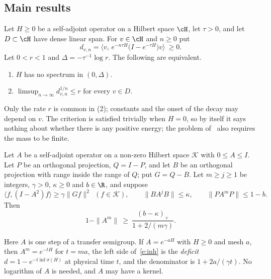 \subsection{Main results}
\begin{theorem}\label{t:crit}
Let $H\ge0$ be a self-adjoint operator on a Hilbert space $\cH$, let $\tau>0$, and let $D\subset\cH$ have dense
linear span. For $v\in\cH$ and $n\ge0$ put
\[
d_{v,n}=\big\langle v,\,e^{-n\tau H}\big(I-e^{-\tau H}\big)v\big\rangle\ \ge0 .
\]
Let $0<r<1$ and $\Delta=-\tau^{-1}\log r$. The following are equivalent.
\begin{enumerate}
\item $H$ has no spectrum in $(0,\Delta)$.
\item $\limsup_{n\to\infty}d_{v,n}^{1/n}\le r$ for every $v\in D$.
\end{enumerate}
\end{theorem}

Only the rate $r$ is common in (2); constants and the onset of the decay may depend on $v$. The criterion is
satisfied trivially when $H=0$, so by itself it says nothing about whether there is any positive energy; the
problem of~\cite{JW} also requires the mass to be finite.

\begin{theorem}\label{t:inh}
Let $A$ be a self-adjoint operator on a non-zero Hilbert space $\mathcal K$ with $0\le A\le I$. Let $P$ be an
orthogonal projection, $Q=I-P$, and let $B$ be an orthogonal projection with range inside the range of $Q$;
put $G=Q-B$. Let $m\ge j\ge1$ be integers, $\gamma>0$, $\kappa\ge0$ and $b\in\R$, and suppose
\begin{equation}\label{e:hyp}
\langle f,(I-A^{2})f\rangle\ge\gamma\|Gf\|^2\ \ (f\in\mathcal K),\qquad
\|BA^{j}B\|\le\kappa,\qquad \|PA^{m}P\|\le1-b .
\end{equation}
Then
\begin{equation}\label{e:inh}
1-\|A^m\|\ \ge\ \frac{(b-\kappa)_+}{1+2/(m\gamma)} .
\end{equation}
\end{theorem}

Here $A$ is one step of a transfer semigroup. If $A=e^{-aH}$ with $H\ge0$ and mesh $a$, then $A^m=e^{-tH}$ for
$t=ma$, the left side of~\eqref{e:inh} is the \emph{deficit} $d=1-e^{-t\inf\sigma(H)}$ at physical time $t$, and
the denominator is $1+2a/(\gamma t)$. No logarithm of $A$ is needed, and $A$ may have a kernel.

